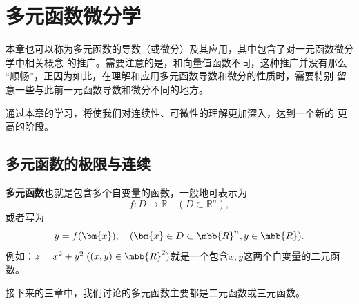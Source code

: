 \setcounter{chapter}{8}

\chapter{多元函数微分学}

本章也可以称为多元函数的导数（或微分）及其应用，其中包含了对一元函数微分学中相关概念
的推广。需要注意的是，和向量值函数不同，这种推广并没有那么
“顺畅”，正因为如此，在理解和应用多元函数导数和微分的性质时，需要特别
留意一些与此前一元函数导数和微分不同的地方。

通过本章的学习，将使我们对连续性、可微性的理解更加深入，达到一个新的
更高的阶段。

\section{多元函数的极限与连续}

{\bf 多元函数}也就是包含多个自变量的函数，一般地可表示为
$$f:D\to\mathbb{R}\quad(D\subset{\mathbb{R}^n}),$$
或者写为
$$y=f(\bm{x}),\quad(\bm{x}\in D\subset\mbb{R}^n,y\in\mbb{R}).$$
例如：$z=x^2+y^2\;((x,y)\in\mbb{R}^2)$就是一个包含$x,y$这两个自变量的二元函数。

接下来的三章中，我们讨论的多元函数主要都是二元函数或三元函数。

